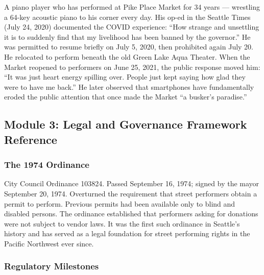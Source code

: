 \documentclass[11pt,letterpaper]{article}
\begin{document}
A piano player who has performed at Pike Place Market for 34 years --- wrestling a 64-key acoustic piano to his corner every day. His op-ed in the Seattle Times (July 24, 2020) documented the COVID experience: ``How strange and unsettling it is to suddenly find that my livelihood has been banned by the governor.'' He was permitted to resume briefly on July 5, 2020, then prohibited again July 20. He relocated to perform beneath the old Green Lake Aqua Theater. When the Market reopened to performers on June 25, 2021, the public response moved him: ``It was just heart energy spilling over. People just kept saying how glad they were to have me back.'' He later observed that smartphones have fundamentally eroded the public attention that once made the Market ``a busker's paradise.''

\subsection{Module 3: Legal and Governance Framework Reference}

\subsubsection{The 1974 Ordinance}

City Council Ordinance 103824. Passed September 16, 1974; signed by the mayor September 20, 1974. Overturned the requirement that street performers obtain a permit to perform. Previous permits had been available only to blind and disabled persons. The ordinance established that performers asking for donations were not subject to vendor laws. It was the first such ordinance in Seattle's history and has served as a legal foundation for street performing rights in the Pacific Northwest ever since.

\subsubsection{Regulatory Milestones}
\end{document}

